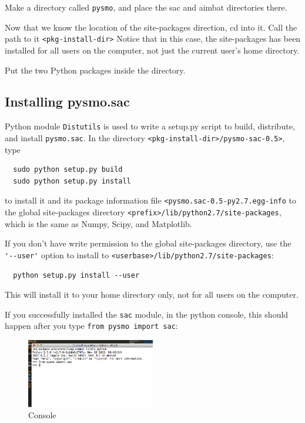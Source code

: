 \documentclass[letterpaper,10pt]{article}
\begin{document}
Make a directory called \verb"pysmo", and place the sac and aimbat directories there. 

Now that we know the location of the site-packages direction, cd into it. Call the path to it \verb"<pkg-install-dir>" Notice that in this case, the site-packages has been installed for all users on the computer, not just the current user's home directory. 

Put the two Python packages inside the directory.


\subsection{Installing pysmo.sac}

Python module \verb"Distutils" is used to write a setup.py script to build, distribute, and install \verb"pysmo.sac". In the directory \verb"<pkg-install-dir>/pysmo-sac-0.5>", type 

\begin{verbatim}
  sudo python setup.py build
  sudo python setup.py install
\end{verbatim}

to install it and its package information file \verb"<pysmo.sac-0.5-py2.7.egg-info" to the global site-packages directory \verb"<prefix>/lib/python2.7/site-packages", which is the same as Numpy, Scipy, and Matplotlib.

If you don't have write permission to the global site-packages directory, use the \verb"'--user'" option to install to \verb"<userbase>/lib/python2.7/site-packages":

\begin{verbatim}
  python setup.py install --user
\end{verbatim}

This will install it to your home directory only, not for all users on the computer. 

If you successfully installed the \verb"sac" module, in the python console, this should happen after you type \verb"from pysmo import sac": 

\begin{figure}[h!]
  \centering
  \includegraphics[width=0.5\textwidth]{images/sac_installed}
  \caption{Console}
  \label{fig:sac_installed}
\end{figure}
\end{document}

